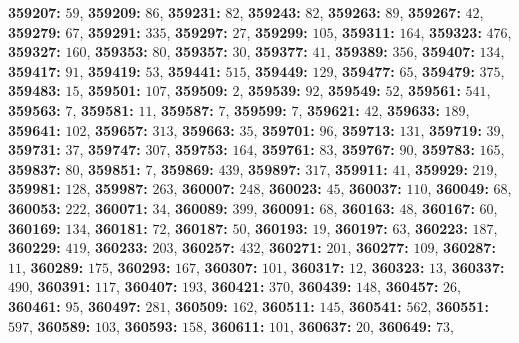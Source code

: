 \textsf{\bfseries 359207:} $59$, \textsf{\bfseries 359209:} $86$, \textsf{\bfseries 359231:} $82$, \textsf{\bfseries 359243:} $82$, \textsf{\bfseries 359263:} $89$, \textsf{\bfseries 359267:} $42$, \textsf{\bfseries 359279:} $67$, \textsf{\bfseries 359291:} $335$, \textsf{\bfseries 359297:} $27$, \textsf{\bfseries 359299:} $105$, \textsf{\bfseries 359311:} $164$, \textsf{\bfseries 359323:} $476$, \textsf{\bfseries 359327:} $160$, \textsf{\bfseries 359353:} $80$, \textsf{\bfseries 359357:} $30$, \textsf{\bfseries 359377:} $41$, \textsf{\bfseries 359389:} $356$, \textsf{\bfseries 359407:} $134$, \textsf{\bfseries 359417:} $91$, \textsf{\bfseries 359419:} $53$, \textsf{\bfseries 359441:} $515$, \textsf{\bfseries 359449:} $129$, \textsf{\bfseries 359477:} $65$, \textsf{\bfseries 359479:} $375$, \textsf{\bfseries 359483:} $15$, \textsf{\bfseries 359501:} $107$, \textsf{\bfseries 359509:} $2$, \textsf{\bfseries 359539:} $92$, \textsf{\bfseries 359549:} $52$, \textsf{\bfseries 359561:} $541$, \textsf{\bfseries 359563:} $7$, \textsf{\bfseries 359581:} $11$, \textsf{\bfseries 359587:} $7$, \textsf{\bfseries 359599:} $7$, \textsf{\bfseries 359621:} $42$, \textsf{\bfseries 359633:} $189$, \textsf{\bfseries 359641:} $102$, \textsf{\bfseries 359657:} $313$, \textsf{\bfseries 359663:} $35$, \textsf{\bfseries 359701:} $96$, \textsf{\bfseries 359713:} $131$, \textsf{\bfseries 359719:} $39$, \textsf{\bfseries 359731:} $37$, \textsf{\bfseries 359747:} $307$, \textsf{\bfseries 359753:} $164$, \textsf{\bfseries 359761:} $83$, \textsf{\bfseries 359767:} $90$, \textsf{\bfseries 359783:} $165$, \textsf{\bfseries 359837:} $80$, \textsf{\bfseries 359851:} $7$, \textsf{\bfseries 359869:} $439$, \textsf{\bfseries 359897:} $317$, \textsf{\bfseries 359911:} $41$, \textsf{\bfseries 359929:} $219$, \textsf{\bfseries 359981:} $128$, \textsf{\bfseries 359987:} $263$, \textsf{\bfseries 360007:} $248$, \textsf{\bfseries 360023:} $45$, \textsf{\bfseries 360037:} $110$, \textsf{\bfseries 360049:} $68$, \textsf{\bfseries 360053:} $222$, \textsf{\bfseries 360071:} $34$, \textsf{\bfseries 360089:} $399$, \textsf{\bfseries 360091:} $68$, \textsf{\bfseries 360163:} $48$, \textsf{\bfseries 360167:} $60$, \textsf{\bfseries 360169:} $134$, \textsf{\bfseries 360181:} $72$, \textsf{\bfseries 360187:} $50$, \textsf{\bfseries 360193:} $19$, \textsf{\bfseries 360197:} $63$, \textsf{\bfseries 360223:} $187$, \textsf{\bfseries 360229:} $419$, \textsf{\bfseries 360233:} $203$, \textsf{\bfseries 360257:} $432$, \textsf{\bfseries 360271:} $201$, \textsf{\bfseries 360277:} $109$, \textsf{\bfseries 360287:} $11$, \textsf{\bfseries 360289:} $175$, \textsf{\bfseries 360293:} $167$, \textsf{\bfseries 360307:} $101$, \textsf{\bfseries 360317:} $12$, \textsf{\bfseries 360323:} $13$, \textsf{\bfseries 360337:} $490$, \textsf{\bfseries 360391:} $117$, \textsf{\bfseries 360407:} $193$, \textsf{\bfseries 360421:} $370$, \textsf{\bfseries 360439:} $148$, \textsf{\bfseries 360457:} $26$, \textsf{\bfseries 360461:} $95$, \textsf{\bfseries 360497:} $281$, \textsf{\bfseries 360509:} $162$, \textsf{\bfseries 360511:} $145$, \textsf{\bfseries 360541:} $562$, \textsf{\bfseries 360551:} $597$, \textsf{\bfseries 360589:} $103$, \textsf{\bfseries 360593:} $158$, \textsf{\bfseries 360611:} $101$, \textsf{\bfseries 360637:} $20$, \textsf{\bfseries 360649:} $73$, 
